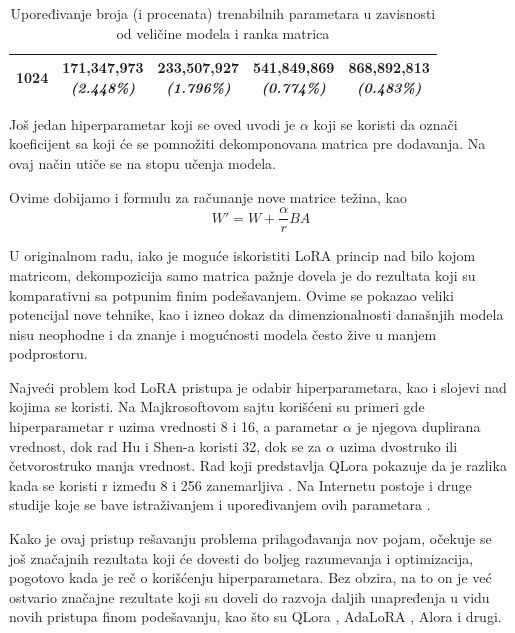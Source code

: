\documentclass[12pt,oneside]{memoir}
\begin{document}
\begin{table}[h!]
\begin{tabular}{|c|c|c|c|c|}
		\hline
		1024 & \makecell{171,347,973 \\ \textit{(2.448\%)}} & \makecell{233,507,927 \\ \textit{(1.796\%)}} & \makecell{541,849,869 \\ \textit{(0.774\%)}} & \makecell{868,892,813 \\ \textit{(0.483\%)}} \\ 
		\hline
	\end{tabular}
	\caption{Upoređivanje broja (i procenata) trenabilnih parametara u zavisnosti od veličine modela i ranka matrica}
	\label{tab:LoRARank}
\end{table}

Još jedan hiperparametar koji se oved uvodi je \(\alpha\) koji se koristi da označi koeficijent sa koji će se pomnožiti dekomponovana matrica pre dodavanja. Na ovaj način utiče se na stopu učenja modela. 

Ovime dobijamo i formulu za računanje nove matrice težina, kao 
\begin{equation}
	W' = W + \frac{\alpha}{r} BA
\end{equation}

U originalnom radu, iako je moguće iskoristiti LoRA princip nad bilo kojom matricom, dekompozicija samo matrica pažnje dovela je do rezultata koji su komparativni sa potpunim finim podešavanjem. Ovime se pokazao veliki potencijal nove tehnike, kao i izneo dokaz da dimenzionalnosti današnjih modela nisu neophodne i da znanje i mogućnosti modela često žive u manjem podprostoru.

Najveći problem kod LoRA pristupa je odabir hiperparametara, kao i slojevi nad kojima se koristi. Na Majkrosoftovom sajtu korišćeni su primeri gde hiperparametar r uzima vrednosti 8 i 16, a parametar \(\alpha\) je njegova duplirana vrednost\cite{microsoft_lora}, dok rad Hu i Shen-a koristi 32, dok se za \(\alpha\) uzima dvostruko ili četvorostruko manja vrednost. Rad koji predstavlja QLora pokazuje da je razlika kada se koristi r između 8 i 256 zanemarljiva \cite{2023dettmersQLora}. Na Internetu postoje i druge studije koje se bave istraživanjem i upoređivanjem ovih parametara \cite{unsloth_lora}.

Kako je ovaj pristup rešavanju problema prilagođavanja nov pojam, očekuje se još značajnih rezultata koji će dovesti do boljeg razumevanja i optimizacija, pogotovo kada je reč o korišćenju hiperparametara. Bez obzira, na to on je već ostvario značajne rezultate koji su doveli do razvoja daljih unapređenja u vidu novih pristupa finom podešavanju, kao što su QLora \cite{2023dettmersQLora}, AdaLoRA \cite{zhang2023adalora}, Alora \cite{liu2024alora} i drugi.
\end{document}
